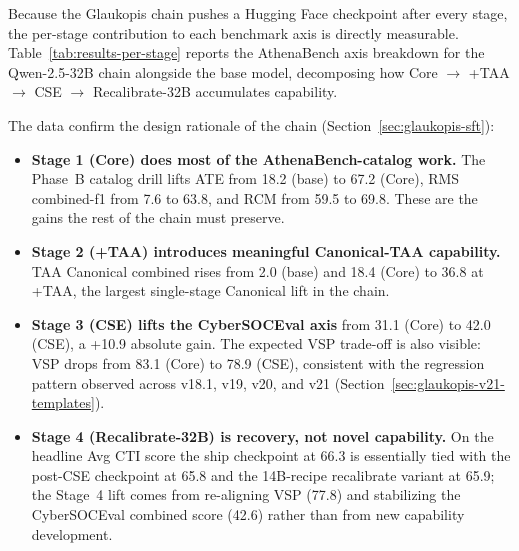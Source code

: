 \documentclass[unnumsec,webpdf,contemporary,large]{oup-authoring-template}
\theoremstyle{thmstyleone}
\theoremstyle{thmstyletwo}
\theoremstyle{thmstylethree}
\begin{document}
Because the Glaukopis chain pushes a Hugging Face checkpoint after every stage, the per-stage contribution to each benchmark axis is directly measurable. Table~\ref{tab:results-per-stage} reports the AthenaBench axis breakdown for the Qwen-2.5-32B chain alongside the base model, decomposing how Core $\to$ +TAA $\to$ CSE $\to$ Recalibrate-32B accumulates capability.

The data confirm the design rationale of the chain (Section~\ref{sec:glaukopis-sft}):

\begin{itemize}
  \item \textbf{Stage 1 (Core) does most of the AthenaBench-catalog work.} The Phase~B catalog drill lifts ATE from 18.2 (base) to 67.2 (Core), RMS combined-f1 from 7.6 to 63.8, and RCM from 59.5 to 69.8. These are the gains the rest of the chain must preserve.
  \item \textbf{Stage 2 (+TAA) introduces meaningful Canonical-TAA capability.} TAA Canonical combined rises from 2.0 (base) and 18.4 (Core) to 36.8 at +TAA, the largest single-stage Canonical lift in the chain.
  \item \textbf{Stage 3 (CSE) lifts the CyberSOCEval axis} from 31.1 (Core) to 42.0 (CSE), a +10.9 absolute gain. The expected VSP trade-off is also visible: VSP drops from 83.1 (Core) to 78.9 (CSE), consistent with the regression pattern observed across v18.1, v19, v20, and v21 (Section~\ref{sec:glaukopis-v21-templates}).
  \item \textbf{Stage 4 (Recalibrate-32B) is recovery, not novel capability.} On the headline Avg CTI score the ship checkpoint at 66.3 is essentially tied with the post-CSE checkpoint at 65.8 and the 14B-recipe recalibrate variant at 65.9; the Stage~4 lift comes from re-aligning VSP (77.8) and stabilizing the CyberSOCEval combined score (42.6) rather than from new capability development.
\end{itemize}
\end{document}

